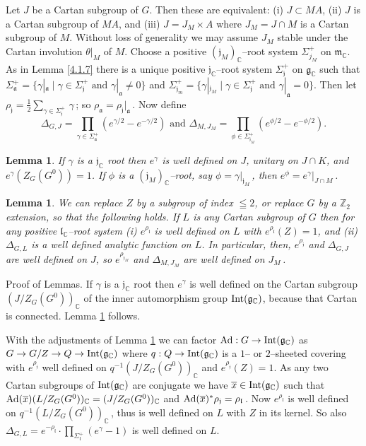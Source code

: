 \documentclass{conm-p-l}
\newtheorem{lemma}[equation]{Lemma}
\renewcommand{\gg}{\mathfrak{g}}
\def\ga{\mathfrak{a}}
\def\gg{\mathfrak{g}}
\def\gj{\mathfrak{j}}
\def\gl{\mathfrak{l}}
\def\gm{\mathfrak{m}}
\def\Int{{\rm Int}}
\def\Ad{{\rm Ad}}
\def\C{\mathbb{C}}
\def\Z{\mathbb{Z}}
\begin{document}
Let $J$ be a Cartan subgroup of $G$.  Then these are equivalent: (i) 
$J \subset MA$, (ii) $J$ is a Cartan subgroup of $MA$, and (iii)
$J = J_M \times A$ where $J_M = J \cap M$ is a Cartan subgroup of $M$.
Without loss of generality we may assume $J_M$ stable under the Cartan
involution $\theta|_M$ of $M$.  Choose a positive $(\gj_M)_\C$--root
system $\Sigma_{j_M}^+$ on $\gm_\C$.  As in Lemma \ref{4.1.7} there is a 
unique positive $\gj_\C$--root system $\Sigma_{\gj}^+$ on $\gg_\C$ such that
$\Sigma_\ga^+ = \{\gamma|_\ga \mid \gamma \in \Sigma_\gj^+ \text{ and }
\gamma|_\ga \ne 0\}$ and $\Sigma_{\gj_m}^+ = \{\gamma|_{\gj_M} \mid
\gamma \in \Sigma_\gj^+ \text{ and } \gamma|_\ga = 0\}$.  Then let
$\rho_\gj = \tfrac{1}{2}\sum_{\gamma \in \Sigma_\gj^+}\,\gamma$\,; so
$\rho_\ga = \rho_\gj|_\ga$\,.  Now define
\begin{equation}\label{4.3.4}
\Delta_{G,J} = {\prod}_{\gamma \in \Sigma_\ga^+} (e^{\gamma/2} - 
	e^{-\gamma/2}) \text{ and } \Delta_{M,J_M} =
	{\prod}_{\phi \in \Sigma_{\gj_M}^+} (e^{\phi/2} - e^{-\phi/2}).
\end{equation}
\begin{lemma}\label{4.3.5}
If $\gamma$ is a $\gj_\C$ root then $e^\gamma$ is well defined on $J$, 
unitary on $J\cap K$, and $e^\gamma(Z_G(G^0)) = 1$.  If $\phi$ is a
$(\gj_M)_\C$--root, say $\phi = \gamma|_{\gj_M}$\,, then $e^\phi =
e^\gamma|_{J\cap M}$\,.
\end{lemma}
\begin{lemma}\label{4.3.6}
We can replace $Z$ by a subgroup of index $\leqq 2$, or replace $G$ by a
$\Z_2$ extension, so that the following holds.  If $L$ is any Cartan subgroup
of $G$ then for any positive $\gl_\C$--root system (i) $e^{\rho_\gl}$
is well defined on $L$ with $e^{\rho_\gl}(Z) = 1$, and (ii) $\Delta_{G,L}$
is a well defined analytic function on $L$.  In particular, then, 
$e^{\rho_\gj}$ and $\Delta_{G,J}$ are well defined on $J$, so 
$e^{\rho_{\gj_M}}$ and $\Delta_{M,J_M}$ are well defined on $J_M$\,.
\end{lemma}

{\sc Proof of Lemmas.} If $\gamma$ is a $\gj_\C$ root then $e^\gamma$ is 
well defined on the Cartan subgroup $(J/Z_G(G^0))_\C$ of the inner 
automorphism group $\Int(\gg_\C)$, because that Cartan is connected.
Lemma \ref{4.3.5} follows.  

With the adjustments of Lemma \ref{4.3.6}
we can factor $\Ad: G \to \Int(\gg_\C)$ as $G \to G/Z \to Q \to \Int(\gg_\C)$
where $q:Q \to \Int(\gg_\C)$ is a $1$-- or $2$--sheeted covering with
$e^{\rho_\gj}$ well defined on $q^{-1}(J/Z_G(G^0))_\C$ and
$e^{\rho_\gj}(Z) = 1$.  As any two Cartan subgroups of $\Int(\gg_\C)$ are
conjugate we have $\overline{x} \in \Int(\gg_\C)$ such that 
$\Ad(\overline{x})(L/Z_G(G^0))_\C = (J/Z_G(G^0))_\C$ and 
$\Ad(\overline{x})^*\rho_\gj = \rho_\gl$\,.  Now $e^{\rho_\gl}$ is
well defined on $q^{-1}(L/Z_G(G^0))_\C$\,, thus is well defined on $L$
with $Z$ in its kernel.  So also $\Delta_{G,L} = 
e^{-\rho_\gl}\cdot \prod_{\Sigma_\gl^+} (e^\gamma - 1)$ is well defined
on $L$.
\end{document}
